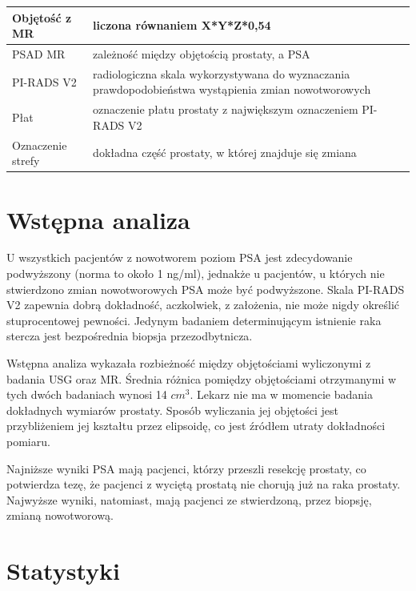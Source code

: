 \documentclass[a4paper,11pt,twoside]{report}
\theoremstyle{definition}
\begin{document}
\begin{table}[h!]
\begin{tabular}{|l|p{10cm}|}
Objętość z MR & liczona równaniem X*Y*Z*0,54                                                                         \\ \hline 
PSAD MR & zależność między objętością prostaty, a PSA                                                               \\ \hline 
PI-RADS V2 & radiologiczna skala wykorzystywana do wyznaczania prawdopodobieństwa wystąpienia zmian nowotworowych   \\ \hline 
Płat & oznaczenie płatu prostaty z największym oznaczeniem PI-RADS V2                                               \\ \hline 
Oznaczenie strefy & dokładna część prostaty, w której znajduje się zmiana                                           \\ \hline 
\end{tabular}
\label{Dane szpitalne}
\end{table}


\section{Wstępna analiza}
U wszystkich pacjentów z nowotworem poziom PSA jest zdecydowanie podwyższony (norma to około 1 ng/ml), jednakże u pacjentów, u których nie stwierdzono zmian nowotworowych PSA może być podwyższone. Skala PI-RADS V2 zapewnia dobrą dokładność, aczkolwiek, z założenia, nie może nigdy określić stuprocentowej pewności. Jedynym badaniem determinującym istnienie raka stercza jest bezpośrednia biopsja przezodbytnicza. 
\par 
Wstępna analiza wykazała rozbieżność między objętościami wyliczonymi z badania USG oraz MR. Średnia różnica pomiędzy objętościami otrzymanymi w tych dwóch badaniach wynosi 14 $cm^3$. Lekarz nie ma w momencie badania dokładnych wymiarów prostaty. Sposób wyliczania jej objętości jest przybliżeniem jej kształtu przez elipsoidę, co jest źródłem utraty dokładności pomiaru.
\par 
Najniższe wyniki PSA mają pacjenci, którzy przeszli resekcję prostaty, co potwierdza tezę, że pacjenci z wyciętą prostatą nie chorują już na raka prostaty. Najwyższe wyniki, natomiast, mają pacjenci ze stwierdzoną, przez biopsję, zmianą nowotworową.

\section{Statystyki}
\end{document}
